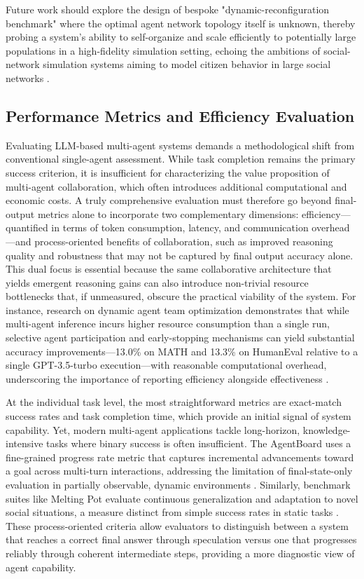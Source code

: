 \documentclass[11pt,a4paper]{article}
\begin{document}
Future work should explore the design of bespoke "dynamic-reconfiguration benchmark" where the optimal agent network topology itself is unknown, thereby probing a system's ability to self-organize and scale efficiently to potentially large populations in a high-fidelity simulation setting, echoing the ambitions of social-network simulation systems aiming to model citizen behavior in large social networks \cite{arxiv:2307.14984v2}.


\subsection{Performance Metrics and Efficiency Evaluation}


Evaluating LLM-based multi-agent systems demands a methodological shift from conventional single-agent assessment. While task completion remains the primary success criterion, it is insufficient for characterizing the value proposition of multi-agent collaboration, which often introduces additional computational and economic costs. A truly comprehensive evaluation must therefore go beyond final-output metrics alone to incorporate two complementary dimensions: efficiency---quantified in terms of token consumption, latency, and communication overhead---and process-oriented benefits of collaboration, such as improved reasoning quality and robustness that may not be captured by final output accuracy alone. This dual focus is essential because the same collaborative architecture that yields emergent reasoning gains can also introduce non-trivial resource bottlenecks that, if unmeasured, obscure the practical viability of the system. For instance, research on dynamic agent team optimization demonstrates that while multi-agent inference incurs higher resource consumption than a single run, selective agent participation and early-stopping mechanisms can yield substantial accuracy improvements---13.0\% on MATH and 13.3\% on HumanEval relative to a single GPT-3.5-turbo execution---with reasonable computational overhead, underscoring the importance of reporting efficiency alongside effectiveness \cite{arxiv:2310.02170v1}.

At the individual task level, the most straightforward metrics are exact-match success rates and task completion time, which provide an initial signal of system capability. Yet, modern multi-agent applications tackle long-horizon, knowledge-intensive tasks where binary success is often insufficient. The AgentBoard uses a fine-grained progress rate metric that captures incremental advancements toward a goal across multi-turn interactions, addressing the limitation of final-state-only evaluation in partially observable, dynamic environments \cite{arxiv:2401.13178v1}. Similarly, benchmark suites like Melting Pot evaluate continuous generalization and adaptation to novel social situations, a measure distinct from simple success rates in static tasks \cite{arxiv:2107.06857v1}. These process-oriented criteria allow evaluators to distinguish between a system that reaches a correct final answer through speculation versus one that progresses reliably through coherent intermediate steps, providing a more diagnostic view of agent capability.
\end{document}
